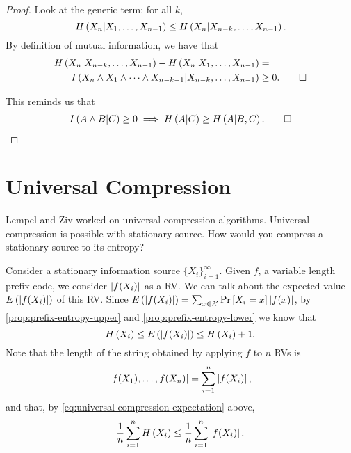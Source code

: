 \begin{proof}
	Look at the generic term: for all $k$,
	\begin{equation*}
		H\left({X_n | X_1, \dots, X_{n-1}}\right)
		\le
		H\left({X_n | X_{n-k}, \dots, X_{n-1}}\right).
	\end{equation*}
	By definition of mutual information, we have that
	\begin{align*}
		H\left({X_n | X_{n-k}, \dots, X_{n-1}}\right)
		-
		H\left({X_n | X_1, \dots, X_{n-1}}\right)
		& =
		\\
		I \left( {X_n \land X_1 \land \dots \land X_{n-k-1} | X_{n-k}, \dots, X_{n-1}} \right)
		& \ge 0. \qedhere
	\end{align*}

	This reminds us that
	\begin{align*}
		I \left( {A \land B | C} \right) \ge 0
		\implies
		H\left({A | C}\right) \ge H\left({A | B, C}\right). \qedhere
	\end{align*}
\end{proof}

\section{Universal Compression}

Lempel and Ziv worked on universal compression algorithms.
Universal compression is possible with stationary source.
How would you compress a stationary source to its entropy?

Consider a stationary information source $\{X_i\}_{i=1}^\infty$.
Given $f$, a variable length prefix code, we consider $\left|{f(X_i)}\right|$ as a \ac{RV}.
We can talk about the expected value $E \left({\left|{f(X_i)}\right|}\right)$ of this \ac{RV}.
Since $E \left({\left|{f(X_i)}\right|}\right) = \sum_{x \in \mathcal{X}} \mathop{\mathrm{Pr}}\limits_{} \left[ {X_i = x} \right] \left|{f(x)}\right|$, by \cref{prop:prefix-entropy-upper} and \cref{prop:prefix-entropy-lower} we know that
\begin{equation} \label{eq:universal-compression-expectation}
	H\left({X_i}\right) \le E \left({\left|{f(X_i)}\right|}\right) \le H\left({X_i}\right) + 1.
\end{equation}
Note that the length of the string obtained by applying $f$ to $n$ \acp{RV} is
\begin{equation*}
	\left|{f(X_1), \dots, f(X_n)}\right| = \sum_{i=1}^n \left|{f(X_i)}\right|,
\end{equation*}
and that, by \cref{eq:universal-compression-expectation} above,
\begin{equation*}
	\frac{1}{n} \sum_{i=1}^n H\left({X_i}\right)
	\le
	\frac{1}{n} \sum_{i=1}^n \left|{f(X_i)}\right|.
\end{equation*}

